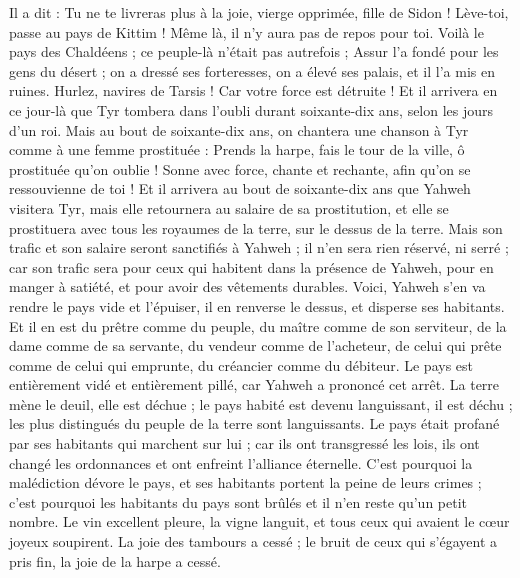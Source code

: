 \begin{multicols}{2}
Il a dit : Tu ne te livreras plus à la joie, vierge opprimée, fille de Sidon ! Lève-toi, passe au pays de Kittim ! Même là, il n'y aura pas de repos pour toi.
Voilà le pays des Chaldéens ; ce peuple-là n'était pas autrefois ; Assur l'a fondé pour les gens du désert ; on a dressé ses forteresses, on a élevé ses palais, et il l'a mis en ruines.
Hurlez, navires de Tarsis ! Car votre force est détruite !
Et il arrivera en ce jour-là que Tyr tombera dans l'oubli durant soixante-dix ans, selon les jours d'un roi. Mais au bout de soixante-dix ans, on chantera une chanson à Tyr comme à une femme prostituée :
Prends la harpe, fais le tour de la ville, ô prostituée qu'on oublie ! Sonne avec force, chante et rechante, afin qu'on se ressouvienne de toi !
Et il arrivera au bout de soixante-dix ans que Yahweh visitera Tyr, mais elle retournera au salaire de sa prostitution, et elle se prostituera avec tous les royaumes de la terre, sur le dessus de la terre.
Mais son trafic et son salaire seront sanctifiés à Yahweh ; il n'en sera rien réservé, ni serré ; car son trafic sera pour ceux qui habitent dans la présence de Yahweh, pour en manger à satiété, et pour avoir des vêtements durables.
\VerseOne{}Voici, Yahweh s'en va rendre le pays vide et l'épuiser, il en renverse le dessus, et disperse ses habitants.
Et il en est du prêtre comme du peuple, du maître comme de son serviteur, de la dame comme de sa servante, du vendeur comme de l'acheteur, de celui qui prête comme de celui qui emprunte, du créancier comme du débiteur.
Le pays est entièrement vidé et entièrement pillé, car Yahweh a prononcé cet arrêt.
La terre mène le deuil, elle est déchue ; le pays habité est devenu languissant, il est déchu ; les plus distingués du peuple de la terre sont languissants.
Le pays était profané par ses habitants qui marchent sur lui ; car ils ont transgressé les lois, ils ont changé les ordonnances et ont enfreint l'alliance éternelle.
C'est pourquoi la malédiction dévore le pays, et ses habitants portent la peine de leurs crimes ; c'est pourquoi les habitants du pays sont brûlés et il n'en reste qu'un petit nombre.
Le vin excellent pleure, la vigne languit, et tous ceux qui avaient le cœur joyeux soupirent.
La joie des tambours a cessé ; le bruit de ceux qui s'égayent a pris fin, la joie de la harpe a cessé.

\end{multicols}
